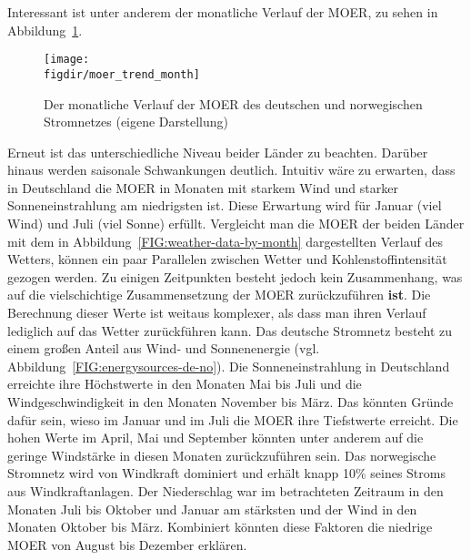 Interessant ist unter anderem der monatliche Verlauf der \ac{MOER}, zu sehen in Abbildung~\ref{FIG:moer_trend_month}.
\begin{figure}
 \caption[Monatlicher Verlauf der MOER von Deutschland und Norwegen]{Der monatliche Verlauf der MOER des deutschen und norwegischen Stromnetzes (eigene Darstellung)}
 {\texttt{[image: \\figdir/moer\_trend\_month]}}
 \label{FIG:moer_trend_month}
\end{figure}
Erneut ist das unterschiedliche Niveau beider Länder zu beachten.
Darüber hinaus werden saisonale Schwankungen deutlich.
Intuitiv wäre zu erwarten, dass in Deutschland die \ac{MOER} in Monaten mit starkem Wind und starker Sonneneinstrahlung am niedrigsten ist.
Diese Erwartung wird für Januar (viel Wind) und Juli (viel Sonne) erfüllt.
Vergleicht man die \ac{MOER} der beiden Länder mit dem in Abbildung~\ref{FIG:weather-data-by-month} dargestellten Verlauf des Wetters, können ein paar Parallelen zwischen Wetter und Kohlenstoffintensität gezogen werden.
Zu einigen Zeitpunkten besteht jedoch kein Zusammenhang, was auf die vielschichtige Zusammensetzung der \ac{MOER} zurückzuführen \textbf{ist}.
Die Berechnung dieser Werte ist weitaus komplexer, als dass man ihren Verlauf lediglich auf das Wetter zurückführen kann.
Das deutsche Stromnetz besteht zu einem großen Anteil aus Wind- und Sonnenenergie (vgl. Abbildung~\ref{FIG:energysources-de-no}).
Die Sonneneinstrahlung in Deutschland erreichte ihre Höchstwerte in den Monaten Mai bis Juli und die Windgeschwindigkeit in den Monaten November bis März.
Das könnten Gründe dafür sein, wieso im Januar und im Juli die \ac{MOER} ihre Tiefstwerte erreicht.
Die hohen Werte im April, Mai und September könnten unter anderem auf die geringe Windstärke in diesen Monaten zurückzuführen sein.
Das norwegische Stromnetz wird von Windkraft dominiert und erhält knapp 10\% seines Stroms aus Windkraftanlagen.
Der Niederschlag war im betrachteten Zeitraum in den Monaten Juli bis Oktober und Januar am stärksten und der Wind in den Monaten Oktober bis März.
Kombiniert könnten diese Faktoren die niedrige \ac{MOER} von August bis Dezember erklären.

